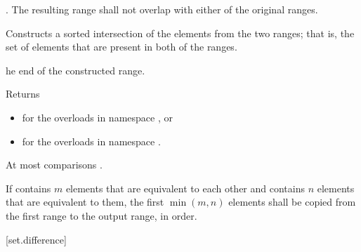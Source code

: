 \begin{itemdescr}
\pnum
\requires
{}.
The resulting range shall not overlap with either of the original ranges.

\pnum
\effects
Constructs a sorted intersection of the elements from the two ranges;
that is, the set of elements that are present in both of the ranges.

\pnum
\returns
{}he end of the
constructed range.
\begin{addedblock}
Returns
\begin{itemize}
\item {} for the overloads in namespace , or
\item {} for the overloads in
  namespace .
\end{itemize}
\end{addedblock}

\pnum
\complexity
At most
comparisons .

\pnum
\remarks {}
If  contains $m$ elements that are equivalent to
each other and  contains $n$ elements that are equivalent
to them, the first $\min(m, n)$ elements shall be copied from the first range
to the output range, in order.
\end{itemdescr}


[set.difference]{}

